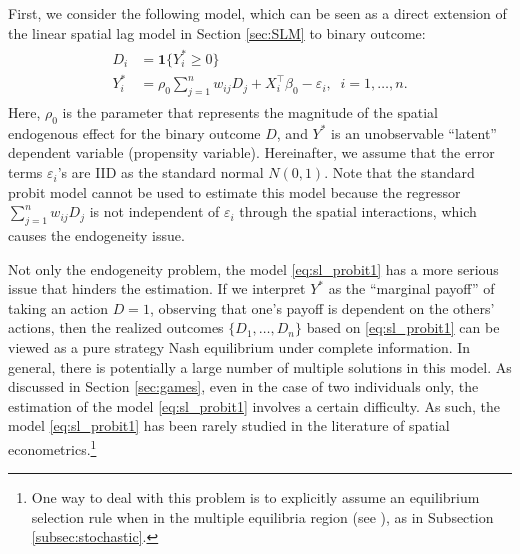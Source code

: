 \documentclass[10.5pt, A4paper, openany, uplatex]{book}
\newcommand{\eps}{\varepsilon}
\numberwithin{equation}{section}
\begin{document}
First, we consider the following model, which can be seen as a direct extension of the linear spatial lag model in Section \ref{sec:SLM} to binary outcome:
\begin{align}\label{eq:sl_probit1}
\begin{split}
	D_i & = \mathbf{1}\{Y^*_i \geq 0\}\\
	Y^*_i & = \rho_0 \sum_{j = 1}^n w_{ij} D_j + X_i^\top \beta_0 - \eps_i, \;\; i = 1 , \ldots, n.
\end{split}
\end{align}
Here, $\rho_0$ is the parameter that represents the magnitude of the spatial endogenous effect for the binary outcome $D$, and $Y^*$ is an unobservable ``latent'' dependent variable (propensity variable).
Hereinafter, we assume that the error terms $\eps_i$'s are IID as the standard normal $N(0,1)$.
Note that the standard probit model cannot be used to estimate this model because the regressor $\sum_{j = 1}^n w_{ij} D_j$ is not independent of $\eps_i$ through the spatial interactions, which causes the endogeneity issue.

Not only the endogeneity problem, the model \eqref{eq:sl_probit1} has a more serious issue that hinders the estimation.
If we interpret $Y^*$ as the ``marginal payoff'' of taking an action $D = 1$, observing that one's payoff is dependent on the others' actions, then the realized outcomes $\{D_1, \ldots, D_n \}$ based on \eqref{eq:sl_probit1} can be viewed as a pure strategy Nash equilibrium under complete information.
In general, there is potentially a large number of multiple solutions in this model.
As discussed in Section \ref{sec:games}, even in the case of two individuals only, the estimation of the model \eqref{eq:sl_probit1} involves a certain difficulty.
As such, the model \eqref{eq:sl_probit1} has been rarely studied in the literature of spatial econometrics.\footnote{
	One way to deal with this problem is to explicitly assume an equilibrium selection rule when in the multiple equilibria region (see \cite{soetevent2007discrete}), as in Subsection \ref{subsec:stochastic}.
}
\bigskip
\end{document}
